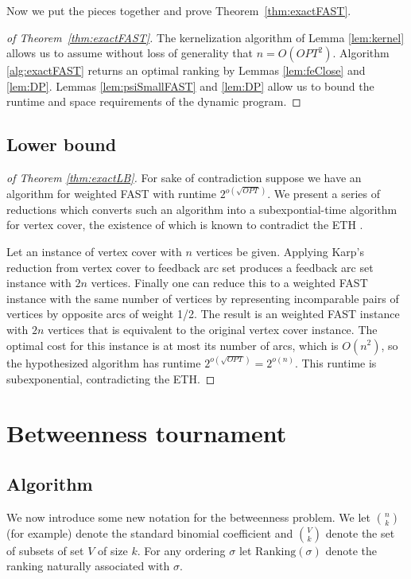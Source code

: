 \documentclass[envcountsame,oribibl]{llncs}
\begin{document}
Now we put the pieces together and prove Theorem~\ref{thm:exactFAST}.
\begin{proof}[of Theorem~\ref{thm:exactFAST}]
The kernelization algorithm of Lemma \ref{lem:kernel} allows us to assume without loss of generality that $n=O(OPT^2)$. Algorithm \ref{alg:exactFAST} returns an optimal ranking by Lemmas  \ref{lem:feClose} and \ref{lem:DP}. Lemmas \ref{lem:psiSmallFAST} and \ref{lem:DP} allow us to bound the runtime and space requirements of the dynamic program.
\end{proof}

\subsection{Lower bound}  \label{sec:lb}



\begin{proof}[of Theorem \ref{thm:exactLB}]
For sake of contradiction suppose we have an algorithm for weighted FAST with runtime $2^{o(\sqrt{OPT})}$. We present a series of reductions which converts such an algorithm into a subexpontial-time algorithm for vertex cover, the existence of which is known to contradict the ETH \cite{Flum06}.

Let an instance of vertex cover with $n$ vertices be given. Applying Karp's reduction from vertex cover to feedback arc set \cite{Karp72} produces a feedback arc set instance with $2n$ vertices. Finally one can reduce this to a weighted FAST instance with the same number of vertices by representing incomparable pairs of vertices by opposite arcs of weight 1/2. The result is an weighted FAST instance with $2n$ vertices that is equivalent to the original vertex cover instance. The optimal cost for this instance is at most its number of arcs, which is $O(n^2)$, so the hypothesized algorithm has runtime $2^{o(\sqrt{OPT})}=2^{o(n)}$. This runtime is subexponential, contradicting the ETH.
\end{proof}


\section{Betweenness tournament}  \label{sec:bet}

\subsection{Algorithm}  \label{sec:betAlg}

We now introduce some new notation for the betweenness problem. We let $\binom{n}{k}$ (for example) denote the standard binomial coefficient and $\binom{V}{k}$ denote the set of subsets of set $V$ of size $k$. For any ordering $\sigma$ let $\text{Ranking}(\sigma)$ denote the ranking naturally associated with $\sigma$.
\end{document}
